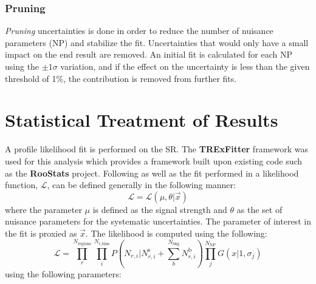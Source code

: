 \subsubsection{Pruning}
\label{sec:Pruning}
\textit{Pruning} uncertainties is done in order to reduce the number of nuisance parameters (NP) and stabilize the fit.  Uncertainties that would only have a small impact on the end result are removed.  An initial fit is calculated for each NP using the $\pm 1 \sigma$ variation, and if the effect on the uncertainty is less than the given threshold of 1\%, the contribution is removed from further fits. %

\section{Statistical Treatment of Results}
\label{sec:StatTreatment}
A profile likelihood fit is performed on the SR.  The \textbf{TRExFitter} framework\cite{TRExFitter} was used for this analysis which provides a framework built upon existing code such as the \textbf{RooStats} project\cite{Moneta:2010pm}.
Following \cite{Lista:2016chp} as well as the fit performed in \cite{GregorFCNC} a likelihood function, $\mathcal{L}$, can be defined generally in the following manner:
\[ \mathcal{L} = \mathcal{L}(\mu,\theta|\overrightarrow{x})
\]
where the parameter $\mu$ is defined as the signal strength and $\theta$ as the set of nuisance parameters for the systematic uncertainties.  The parameter of interest in the fit is proxied as  $\overrightarrow{x}$.  The likelihood is computed using the following:
\[ \mathcal{L} = \displaystyle\prod_{r}^{N_\text{regions}}  \displaystyle\prod_{i}^{N_\text{r,bins}} P(N_{r,i}|N_{r,i}^\text{s} + \displaystyle\sum_{b}^{N_\text{bkg}}N_{r,i}^\text{b}) \displaystyle\prod_{j}^{N_\text{NP}} G(x|1,\sigma_{j})
\]
using the following parameters:
